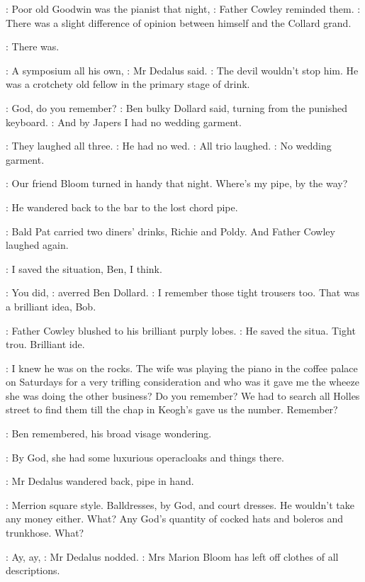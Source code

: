 \Cowley:
Poor old Goodwin was the pianist that night,
:
Father Cowley reminded them.
\Cowley:
There was a slight difference of opinion between himself and the
Collard grand.

:
There was.

\Simon:
A symposium all his own,
:
Mr Dedalus said.
\Simon:
The devil wouldn't stop him.
He was a crotchety old fellow in the primary stage of drink.

\Dollard:
God, do you remember?
:
Ben bulky Dollard said, turning from the punished keyboard.
\Dollard:
And by Japers I had no wedding garment.

:
They laughed all three.
\Simon:
He had no wed.
:
All trio laughed.
\Dollard:
No wedding garment.

\Simon:
Our friend Bloom turned in handy that night. Where's
my pipe, by the way?

:
He wandered back to the bar to the lost chord pipe.

:
Bald Pat carried
two diners' drinks, Richie and Poldy. And Father Cowley laughed again.

\Cowley:
I saved the situation,
Ben, I think.

\Dollard:
You did,
:
averred Ben Dollard.
\Dollard:
I remember those tight trousers too.
That was a brilliant idea, Bob.

:
Father Cowley blushed to his brilliant purply lobes.
\Cowley:
He saved the
situa. Tight trou. Brilliant ide.

\Cowley:
I knew he was on the rocks. The wife was playing the piano in
the coffee palace on Saturdays for a very trifling consideration and who
was it gave me the wheeze she was doing the other business? Do you
remember? We had to search all Holles street to find them till the chap in
Keogh's gave us the number. Remember?

:
Ben remembered,
his broad visage wondering.

\Dollard:
By God, she had some luxurious operacloaks
and things there.

:
Mr Dedalus wandered back, pipe in hand.

\Dollard:
Merrion square style. Balldresses, by God, and court dresses. He
wouldn't take any money either. What? Any God's quantity of cocked hats
and boleros and trunkhose. What?

\Simon:
Ay, ay,
:
Mr Dedalus nodded.
\Simon:
Mrs Marion Bloom has left off clothes of all descriptions.

